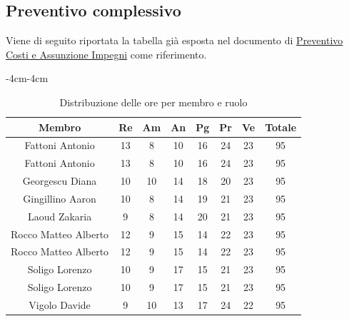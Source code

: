 \documentclass[a4paper,12pt]{article}
\begin{document}
\subsection{Preventivo complessivo}
Viene di seguito riportata la tabella già esposta nel documento di \href{https://7-zpus.github.io/Docs/assets/1_Candidatura/PreventivoCostiEAssunzioneImpegni.pdf}{Preventivo Costi e Assunzione Impegni} come riferimento.
\begin{table}[H]
    \begin{adjustwidth}{-4cm}{-4cm}
    \centering
    \begin{tabular}{|c|c|c|c|c|c|c|c|}
        \hline
        \textbf{Membro} & \textbf{Re} & \textbf{Am} & \textbf{An} & \textbf{Pg} & \textbf{Pr} & \textbf{Ve} & \textbf{Totale} \\
        \hline
        Fattoni Antonio & 13 & 8 & 10 & 16 & 24 & 23 & 95 \\
        Fattoni Antonio & 13 & 8 & 10 & 16 & 24 & 23 & 95 \\
        \hline
        Georgescu Diana & 10 & 10 & 14 & 18 & 20 & 23 & 95 \\
        \hline
        Gingillino Aaron & 10 & 8 & 14 & 19 & 21 & 23 & 95 \\
        \hline
        Laoud Zakaria & 9 & 8 & 14 & 20 & 21 & 23 & 95 \\
        \hline
        Rocco Matteo Alberto & 12 & 9 & 15 & 14 & 22 & 23 & 95 \\
        Rocco Matteo Alberto & 12 & 9 & 15 & 14 & 22 & 23 & 95 \\
        \hline
        Soligo Lorenzo & 10 & 9 & 17 & 15 & 21 & 23 & 95 \\
        Soligo Lorenzo & 10 & 9 & 17 & 15 & 21 & 23 & 95 \\
        \hline
        Vigolo Davide & 9 & 10 & 13 & 17 & 24 & 22 & 95 \\
        \hline
    \end{tabular}
    \caption{Distribuzione delle ore per membro e ruolo}
    \end{adjustwidth}
\end{table}
\newpage
\end{document}
